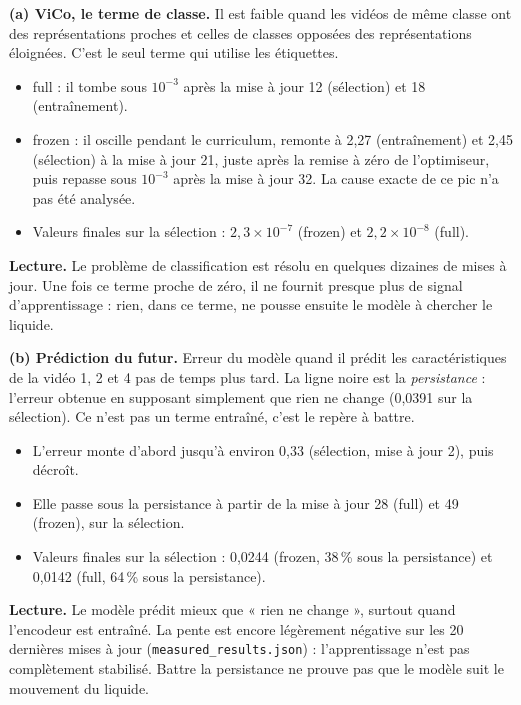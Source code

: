 \documentclass[11pt,a4paper]{article}
\newcommand{\lecture}[1]{\textbf{Lecture.} #1}
\begin{document}
\textbf{(a) ViCo, le terme de classe.} Il est faible quand les vidéos de même classe ont des
représentations proches et celles de classes opposées des représentations éloignées. C'est le seul
terme qui utilise les étiquettes.
\begin{itemize}\itemsep1pt
\item \textcolor{full}{full} : il tombe sous $10^{-3}$ après la mise à jour 12 (sélection) et 18 (entraînement).
\item \textcolor{frozen}{frozen} : il oscille pendant le curriculum, remonte à 2,27 (entraînement) et 2,45
      (sélection) à la mise à jour 21, juste après la remise à zéro de l'optimiseur, puis repasse sous
      $10^{-3}$ après la mise à jour 32. La cause exacte de ce pic n'a pas été analysée.
\item Valeurs finales sur la sélection : $2{,}3\times10^{-7}$ (frozen) et $2{,}2\times10^{-8}$ (full).
\end{itemize}
\lecture{Le problème de classification est résolu en quelques dizaines de mises à jour. Une fois ce
terme proche de zéro, il ne fournit presque plus de signal d'apprentissage : rien, dans ce terme, ne
pousse ensuite le modèle à chercher le liquide.}

\textbf{(b) Prédiction du futur.} Erreur du modèle quand il prédit les caractéristiques de la vidéo
1, 2 et 4 pas de temps plus tard. La ligne noire est la \emph{persistance} : l'erreur obtenue en
supposant simplement que rien ne change (0,0391 sur la sélection). Ce n'est pas un terme entraîné,
c'est le repère à battre.
\begin{itemize}\itemsep1pt
\item L'erreur monte d'abord jusqu'à environ 0,33 (sélection, mise à jour 2), puis décroît.
\item Elle passe sous la persistance à partir de la mise à jour 28 (full) et 49 (frozen), sur la sélection.
\item Valeurs finales sur la sélection : 0,0244 (frozen, 38\,\% sous la persistance) et 0,0142
      (full, 64\,\% sous la persistance).
\end{itemize}
\lecture{Le modèle prédit mieux que « rien ne change », surtout quand l'encodeur est entraîné.
La pente est encore légèrement négative sur les 20 dernières mises à jour
(\texttt{measured\_results.json}) : l'apprentissage n'est pas complètement stabilisé. Battre la
persistance ne prouve pas que le modèle suit le mouvement du liquide.}
\end{document}
